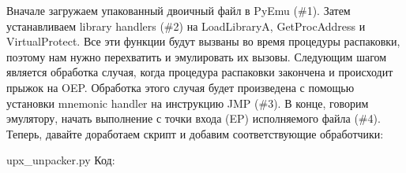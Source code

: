 \documentclass[12pt]{book}
\begin{document}
Вначале загружаем упакованный двоичный файл в PyEmu (\#1). Затем устанавливаем library handlers (\#2) на LoadLibraryA, GetProcAddress и VirtualProtect. Все эти функции будут вызваны во время процедуры распаковки, поэтому нам нужно перехватить и эмулировать их вызовы. Следующим шагом является обработка случая, когда процедура распаковки закончена и происходит прыжок на OEP. Обработка этого случая будет произведена с помощью установки mnemonic handler на инструкцию JMP (\#3). В конце, говорим эмулятору, начать выполнение с точки входа (EP) исполняемого файла (\#4). Теперь, давайте доработаем скрипт и добавим соответствующие обработчики: 

upx\_unpacker.py
Код:





 







\end{document}
